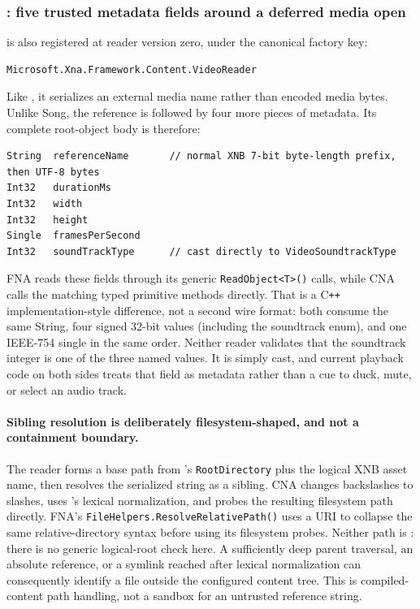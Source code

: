 \subsubsection{: five trusted metadata fields around a deferred media open}
\label{sec:xnb-video-reader}

 is also registered at reader version zero, under the canonical factory
key:

\begin{lstlisting}
Microsoft.Xna.Framework.Content.VideoReader
\end{lstlisting}

Like , it serializes an external media name rather than encoded media bytes.
Unlike Song, the reference is followed by four more pieces of metadata.  Its complete root-object
body is therefore:

\begin{lstlisting}
String  referenceName       // normal XNB 7-bit byte-length prefix, then UTF-8 bytes
Int32   durationMs
Int32   width
Int32   height
Single  framesPerSecond
Int32   soundTrackType      // cast directly to VideoSoundtrackType
\end{lstlisting}

FNA reads these fields through its generic \texttt{ReadObject<T>()} calls, while CNA calls the
matching typed primitive methods directly.  That is a C\texttt{++} implementation-style
difference, not a second wire format: both consume the same String, four signed 32-bit values
(including the soundtrack enum), and one IEEE-754 single in the same order.  Neither reader
validates that the soundtrack integer is one of the three named 
values.  It is simply cast, and current playback code on both sides treats that field as metadata
rather than a cue to duck, mute, or select an audio track.

\paragraph{Sibling resolution is deliberately filesystem-shaped, and not a containment boundary.}
The reader forms a base path from 's \texttt{RootDirectory} plus the
logical XNB asset name, then resolves the serialized string as a sibling.  CNA changes
backslashes to slashes, uses 's lexical normalization, and probes
the resulting filesystem path directly.  FNA's \texttt{FileHelpers.ResolveRelativePath()} uses a
URI to collapse the same relative-directory syntax before using its filesystem probes.  Neither
path is : there is no generic logical-root
check here.  A sufficiently deep parent traversal, an absolute reference, or a symlink reached
after lexical normalization can consequently identify a file outside the configured content
tree.  This is compiled-content path handling, not a sandbox for an untrusted reference string.

